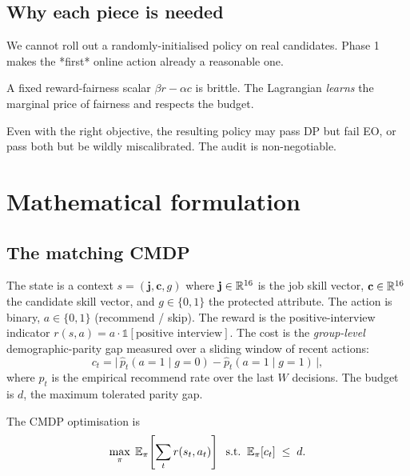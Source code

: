 \documentclass[11pt,oneside]{scrbook}
\begin{document}
\section{Why each piece is needed}

\begin{description}[leftmargin=*]
  \item[Offline first.] We cannot roll out a randomly-initialised policy on
        real candidates. Phase 1 makes the *first* online action already a
        reasonable one.
  \item[Lagrangian.] A fixed reward-fairness scalar $\beta r - \alpha c$ is
        brittle. The Lagrangian \emph{learns} the marginal price of
        fairness and respects the budget.
  \item[Audit before deploy.] Even with the right objective, the resulting
        policy may pass DP but fail EO, or pass both but be wildly
        miscalibrated. The audit is non-negotiable.
\end{description}

\chapter{Mathematical formulation}

\section{The matching CMDP}

\begin{definition}\label{def:match-cmdp}
The state is a context $s = (\mathbf{j}, \mathbf{c}, g)$ where
$\mathbf{j} \in \mathbb{R}^{16}$ is the job skill vector, $\mathbf{c} \in \mathbb{R}^{16}$
the candidate skill vector, and $g \in \{0, 1\}$ the protected attribute. The
action is binary, $a \in \{0, 1\}$ (recommend / skip). The reward is the
positive-interview indicator
$r(s, a) = a \cdot \mathbb{1}[\text{positive interview}]$. The cost is the
\emph{group-level} demographic-parity gap measured over a sliding window of
recent actions:
\[
   c_t = \bigl|\, \widehat{p}_t(a = 1 \mid g = 0) - \widehat{p}_t(a = 1 \mid g = 1) \,\bigr|,
\]
where $\widehat{p}_t$ is the empirical recommend rate over the last $W$
decisions. The budget is $d$, the maximum tolerated parity gap.

The CMDP optimisation is
\[
   \max_\pi\; \mathbb{E}_\pi\!\left[\sum_t r(s_t, a_t)\right] \;\;\text{s.t.}\;\;
   \mathbb{E}_\pi[c_t] \;\leq\; d.
\]
\end{definition}
\end{document}
